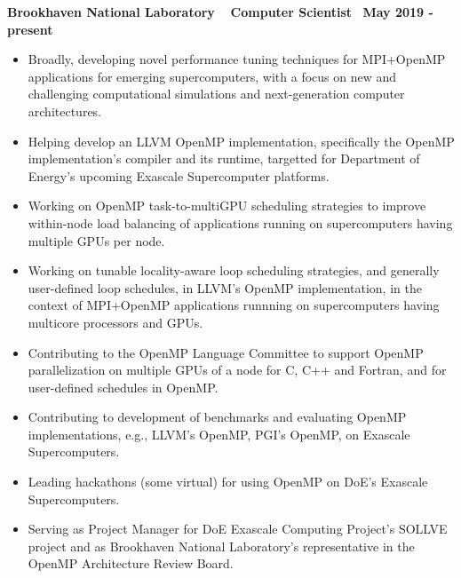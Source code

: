 \textbf{{Brookhaven National Laboratory $\>$$\>$$\>$$\>$Computer Scientist$\>$$\>$$\>$$\>$May 2019 - present}}
\begin{itemize}
\item Broadly, developing novel performance tuning techniques for MPI+OpenMP applications for emerging supercomputers, with a focus on new and challenging computational simulations and next-generation computer architectures.
   \item Helping develop an LLVM OpenMP implementation, specifically the OpenMP implementation's compiler and its runtime, targetted for Department of Energy's upcoming Exascale Supercomputer platforms. 
   \item Working on OpenMP task-to-multiGPU scheduling strategies to improve within-node load balancing of applications running on supercomputers having multiple GPUs per node.
      \item Working on tunable locality-aware loop scheduling strategies, and generally user-defined loop schedules, in LLVM's OpenMP implementation, in the context of MPI+OpenMP applications runnning on supercomputers having multicore processors and GPUs. 
   \item Contributing to the OpenMP Language Committee to support OpenMP parallelization on multiple GPUs of a node for C, C++ and Fortran, and for user-defined schedules in OpenMP.
   \item Contributing to development of benchmarks and evaluating OpenMP implementations, e.g., LLVM's OpenMP, PGI's OpenMP, on Exascale Supercomputers.
   \item Leading hackathons (some virtual) for using OpenMP on DoE's Exascale Supercomputers. 
   \item Serving as Project Manager for DoE Exascale Computing Project’s SOLLVE project and as Brookhaven National Laboratory’s representative in the OpenMP Architecture Review Board. 
\end{itemize}

